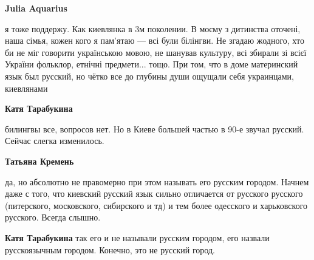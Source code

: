 \begin{itemize}
\begin{itemize}
 

\textbf{Julia Aquarius} 

я тоже поддержу. Как киевлянка в 3м поколении. В моєму з дитинства оточені,
наша сімья, кожен кого я пам'ятаю — всі були білінгви. Не згадаю жодного, хто
би не міг говорити українською мовою, не шанував культуру, всі збирали зі всієї
України фольклор, етнічні предмети... тощо. При том, что в доме материнский
язык был русский, но чётко все до глубины души ощущали себя украинцами,
киевлянами


 
\textbf{Катя Тарабукина} 

билингвы все, вопросов нет. Но в Киеве большей частью в 90-е звучал русский.
Сейчас слегка изменилось.

 

\textbf{Татьяна Кремень} 

да, но абсолютно не правомерно при этом называть его русским городом. Начнем
даже с того, что киевский русский язык сильно отличается от русского русского
(питерского, московского, сибирского и тд) и тем более одесского и харьковского
русского. Всегда слышно.


 

\textbf{Катя Тарабукина} так его и не называли русским городом, его назвали
русскоязычным городом. Конечно, это не русский город.

 


\end{itemize}
\end{itemize}
